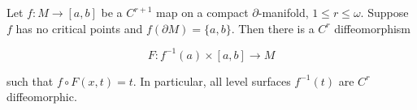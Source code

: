 Let $f: M \to [a, b]$ be a $C^{r+1}$ map on a compact $\partial$-manifold, $1 \leqslant r \leqslant \omega$. Suppose $f$ has no critical points and $f(\partial M) = \{a, b\}$. Then there is a $C^r$ diffeomorphism

$$F: f^{-1}(a) \times [a, b] \to M$$

such that $f \circ F(x, t) = t$. In particular, all level surfaces $f^{-1}(t)$ are $C^r$ diffeomorphic.
